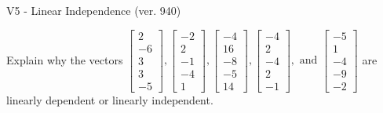 \begin{exercise}
  \begin{exerciseTitle}V5 - Linear Independence (ver. 940)\end{exerciseTitle}
  \begin{exerciseStatement}
    Explain why the vectors \(\left[\begin{array}{r}
2 \\
-6 \\
3 \\
3 \\
-5
\end{array}\right] , \left[\begin{array}{r}
-2 \\
2 \\
-1 \\
-4 \\
1
\end{array}\right] , \left[\begin{array}{r}
-4 \\
16 \\
-8 \\
-5 \\
14
\end{array}\right] , \left[\begin{array}{r}
-4 \\
2 \\
-4 \\
2 \\
-1
\end{array}\right] , \text{ and } \left[\begin{array}{r}
-5 \\
1 \\
-4 \\
-9 \\
-2
\end{array}\right]\) are linearly dependent or linearly independent.	



\end{exerciseStatement}
\end{exercise}
